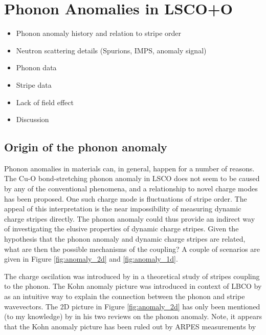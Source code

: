 \chapter{Phonon Anomalies in LSCO+O}\label{ch:anomaly}

\begin{framed}
    \begin{itemize}
        \item Phonon anomaly history and relation to stripe order
        \item Neutron scattering details (Spurions, IMPS, anomaly signal)
        \item Phonon data
        \item Stripe data
        \item Lack of field effect
        \item Discussion
    \end{itemize}    
\end{framed}

\section{Origin of the phonon anomaly}
Phonon anomalies in materials can, in general, happen for a number of reasons. The Cu-O bond-stretching phonon anomaly in LSCO does not seem to be caused by any of the conventional phenomena, and a relationship to novel charge modes has been proposed. One such charge mode is fluctuations of stripe order. The appeal of this interpretation is the near impossibility of measuring dynamic charge stripes directly. The phonon anomaly could thus provide an indirect way of investigating the elusive properties of dynamic charge stripes. Given the hypothesis that the phonon anomaly and dynamic charge stripes are related, what are then the possible mechanisms of the coupling? A couple of scenarios are given in Figure \ref{fig:anomaly_2d} and \ref{fig:anomaly_1d}.

The charge oscilation was introduced by \citeauthor{Kaneshita2002}\cite{Kaneshita2002} in a theoretical study of stripes coupling to the phonon. The Kohn anomaly picture was introduced in context of LBCO by \citeauthor{Reznik2006}\cite{Reznik2006} as an intuitive way to explain the connection between the phonon and stripe wavevectors. The 2D picture in Figure \ref{fig:anomaly_2d} has only been mentioned (to my knowledge) by \citeauthor{Reznik2010} in his two reviews on the phonon anomaly\cite{Reznik2010, Reznik2012}. Note, it appears that the Kohn anomaly picture has been ruled out by ARPES measurements by \citeauthor{Park2014}\cite{Park2014}

